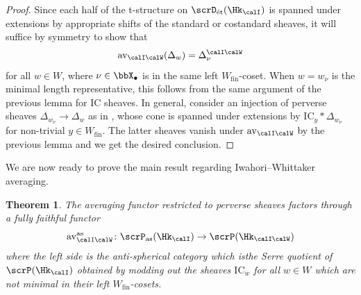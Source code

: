 \documentclass[10pt, reqno]{amsart}
\theoremstyle{plain}
\newtheorem{theorem}{Theorem}[section]
\theoremstyle{definition}
\numberwithin{equation}{section}
\begin{document}
\begin{proof}
	Since each half of the t-structure on $\scrD_{\mathrm{\acute{e}t}}(\Hk_{\calI})$ is spanned under extensions by appropriate shifts of the standard or costandard sheaves, it will suffice by symmetry to show that 
	\begin{equation} \label{equation_av_IW_of_std_objects}
		\mathrm{av}_{\calI\calW}(\Delta_w)=\Delta_\nu^{\calI\calW}
	\end{equation}
	for all $w\in W$, where $\nu \in \bbX_\bullet$ is in the same left $W_{\mathrm{fin}}$-coset. When $w=w_\nu$ is the minimal length representative, this follows from the same argument of the previous lemma for IC sheaves. In general, consider an injection of perverse sheaves $\Delta_{w_{\nu}} \to \Delta_w$ as in \cite[Lemma 3b]{AB09}, whose cone is spanned under extensions by $\mathrm{IC}_y \ast \Delta_{w_\nu}$ for non-trivial $y \in W_{\mathrm{fin}}$. The latter sheaves vanish under $\mathrm{av}_{\calI\calW}$ by the previous lemma and we get the desired conclusion.
\end{proof}

We are now ready to prove the main result regarding Iwahori--Whittaker averaging. %
\begin{theorem}\label{avIW_factos_through_pervas}
	The averaging functor restricted to perverse sheaves factors through a fully faithful functor \begin{equation}\mathrm{av}_{\calI\calW}^{\mathrm{as}}\colon \scrP_{\mathrm{as}}(\Hk_{\calI})\to \scrP(\Hk_{\calI\calW})\end{equation}
	where the left side is the \textit{anti-spherical category} which isthe Serre quotient of $\scrP(\Hk_{\calI})$ obtained by modding out the sheaves $\mathrm{IC}_{w}$ for all $w \in W$ which are not minimal in their left $W_{\mathrm{fin}}$-cosets.
\end{theorem}
\end{document}
